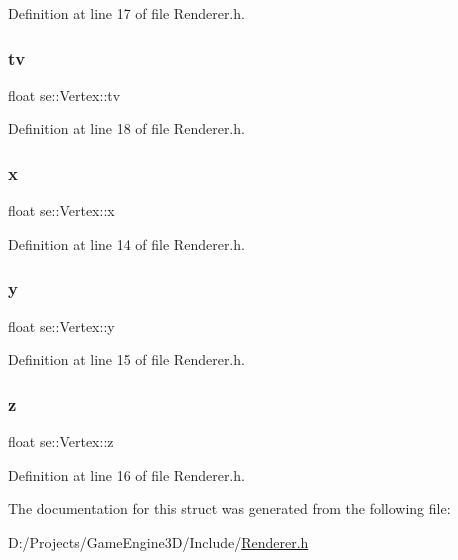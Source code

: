 Definition at line 17 of file Renderer.\+h.

\mbox{\label{structse_1_1_vertex_abd48156d7a9e157ca38d4c4de2101524}} 
\subsubsection{\texorpdfstring{tv}{tv}}
{\footnotesize\ttfamily float se\+::\+Vertex\+::tv}



Definition at line 18 of file Renderer.\+h.

\mbox{\label{structse_1_1_vertex_a861f929c19a2002c84cc45937af25ccd}} 
\subsubsection{\texorpdfstring{x}{x}}
{\footnotesize\ttfamily float se\+::\+Vertex\+::x}



Definition at line 14 of file Renderer.\+h.

\mbox{\label{structse_1_1_vertex_a6e79ab7f589edb89969385db39405297}} 
\subsubsection{\texorpdfstring{y}{y}}
{\footnotesize\ttfamily float se\+::\+Vertex\+::y}



Definition at line 15 of file Renderer.\+h.

\mbox{\label{structse_1_1_vertex_a2a709adb9f77c1611363a550e658983b}} 
\subsubsection{\texorpdfstring{z}{z}}
{\footnotesize\ttfamily float se\+::\+Vertex\+::z}



Definition at line 16 of file Renderer.\+h.



The documentation for this struct was generated from the following file\+:\begin{DoxyCompactItemize}
\item 
D\+:/\+Projects/\+Game\+Engine3\+D/\+Include/\mbox{\hyperlink{_renderer_8h}{Renderer.\+h}}\end{DoxyCompactItemize}
